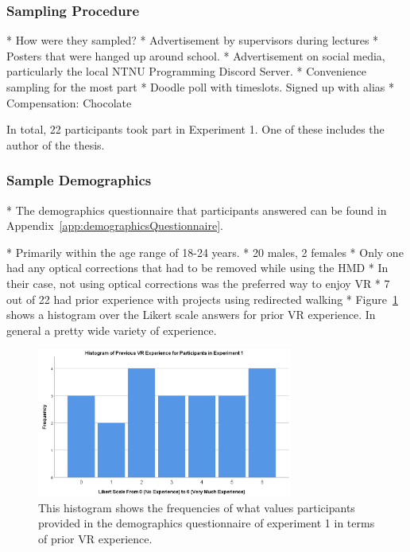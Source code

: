 \subsubsection{Sampling Procedure}
* How were they sampled?
   * Advertisement by supervisors during lectures
   * Posters that were hanged up around school. 
   * Advertisement on social media, particularly the local NTNU Programming Discord Server.
   * Convenience sampling for the most part
   * Doodle poll with timeslots. Signed up with alias
* Compensation: Chocolate

In total, 22 participants took part in Experiment 1. One of these includes the author of the thesis. 

\subsubsection{Sample Demographics}
* The demographics questionnaire that participants answered can be found in Appendix~\ref{app:demographicsQuestionnaire}.


* Primarily within the age range of 18-24 years.
* 20 males, 2 females
* Only one had any optical corrections that had to be removed while using the HMD
   * In their case, not using optical corrections was the preferred way to enjoy VR
* 7 out of 22 had prior experience with projects using redirected walking
* Figure~\ref{fig:ex1PriorVRExperience} shows a histogram over the Likert scale answers for prior VR experience. In general a pretty wide variety of experience. 

\begin{figure}[tbph]
    \centering
    \includegraphics[width=0.75\textwidth]{figures/graphs/Experiment1VRExperienceHisto.png}
    \caption[Histogram on Prior VR Experience of Participants in Experiment 1]{This histogram shows the frequencies of what values participants provided in the demographics questionnaire of experiment 1 in terms of prior VR experience.}
    \label{fig:ex1PriorVRExperience}
\end{figure}

